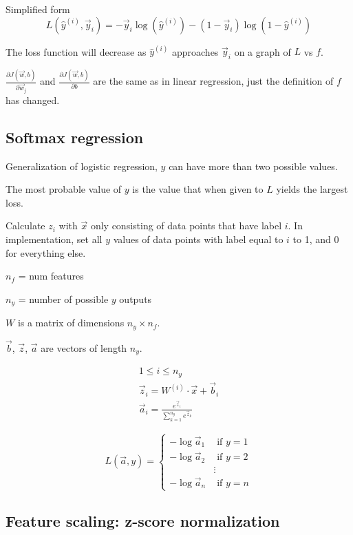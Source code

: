 \documentclass[12pt]{article}
\begin{document}
Simplified form
\[ L(\hat{y}^{(i)}, \vec{y}_i) = -\vec{y}_i \log(\hat{y}^{(i)}) - (1 - \vec{y}_i) \log (1 - \hat{y}^{(i)}) \]

The loss function will decrease as $\hat{y}^{(i)}$ approaches $\vec{y}_i$ on a graph of $L$ vs $f$.

$\frac{\partial J(\vec{w},b)}{\partial \vec{w}_j}$ and $\frac{\partial J(\vec{w},b)}{\partial b}$ are the same as in linear regression, just the definition of $f$ has changed.

\subsection{Softmax regression}

Generalization of logistic regression, $y$ can have more than two possible values.

The most probable value of $y$ is the value that when given to $L$ yields the largest loss.

Calculate $z_i$ with $\vec{x}$ only consisting of data points that have label $i$. In implementation, set all $y$ values of data points with label equal to $i$ to 1, and 0 for everything else.

$n_f$ = num features

$n_y$ = number of possible $y$ outputs

$W$ is a matrix of dimensions $n_y \times n_f$.

$\vec{b}$, $\vec{z}$, $\vec{a}$ are vectors of length $n_y$.

\begin{gather*}
    1 \leq i \leq n_y\\
    \vec{z}_i = W^{(i)} \cdot \vec{x} + \vec{b}_i\\
    \vec{a}_i = \frac{e^{\vec{z}_i}}{\sum_{k=1}^{n_y} e^{\vec{z}_k}}
\end{gather*}

\begin{equation}
L(\vec{a}, y) =
  \left\{
    \begin{aligned}
    -\log \vec{a}_1 &\text{ if } y = 1\\
    -\log \vec{a}_2 &\text{ if } y = 2\\
    & \vdots\\
    -\log \vec{a}_n &\text{ if } y = n
    \end{aligned}
   \right.
\end{equation}

\subsection{Feature scaling: z-score normalization}
\end{document}
